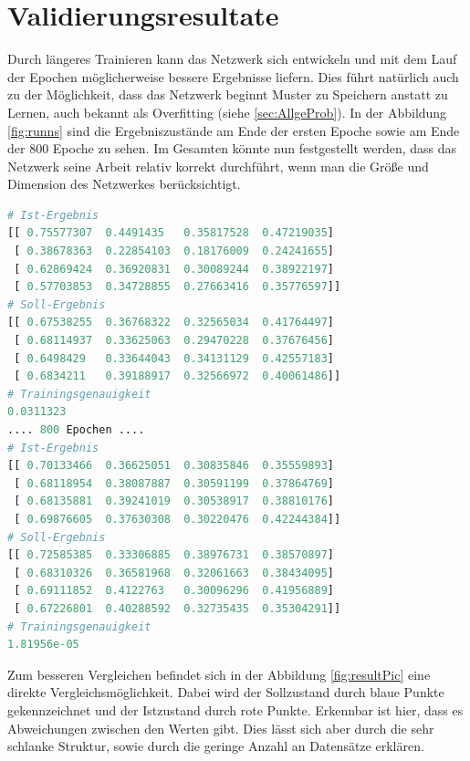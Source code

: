 \section{Validierungsresultate}

Durch längeres Trainieren kann das Netzwerk sich entwickeln und mit dem Lauf der Epochen möglicherweise bessere Ergebnisse liefern. 
Dies führt natürlich auch zu der Möglichkeit, dass das Netzwerk beginnt Muster zu Speichern anstatt zu Lernen, auch bekannt als Overfitting (siehe \ref{sec:AllgeProb}). 
In der Abbildung \ref{fig:runns} sind die Ergebniszustände am Ende der ersten Epoche sowie am Ende der $800$ Epoche zu sehen. 
Im Gesamten könnte nun festgestellt werden, dass das Netzwerk seine Arbeit relativ korrekt durchführt, wenn man die Größe und Dimension des Netzwerkes berücksichtigt. 
\begin{lstlisting}[caption={Ergebnisse am Ende der ersten Epoche und am Ende der $800$ Epoche},label=fig:runns,captionpos=b,language=Python]
# Ist-Ergebnis 
[[ 0.75577307  0.4491435   0.35817528  0.47219035]
 [ 0.38678363  0.22854103  0.18176009  0.24241655]
 [ 0.62869424  0.36920831  0.30089244  0.38922197]
 [ 0.57703853  0.34728855  0.27663416  0.35776597]]
# Soll-Ergebnis
[[ 0.67538255  0.36768322  0.32565034  0.41764497]
 [ 0.68114937  0.33625063  0.29470228  0.37676456]
 [ 0.6498429   0.33644043  0.34131129  0.42557183]
 [ 0.6834211   0.39188917  0.32566972  0.40061486]]
# Trainingsgenauigkeit
0.0311323
.... 800 Epochen ....
# Ist-Ergebnis
[[ 0.70133466  0.36625051  0.30835846  0.35559893]
 [ 0.68118954  0.38087887  0.30591199  0.37864769]
 [ 0.68135881  0.39241019  0.30538917  0.38810176]
 [ 0.69876605  0.37630308  0.30220476  0.42244384]]
# Soll-Ergebnis
[[ 0.72585385  0.33306885  0.38976731  0.38570897]
 [ 0.68310326  0.36581968  0.32061663  0.38434095]
 [ 0.69111852  0.4122763   0.30096296  0.41956889]
 [ 0.67226801  0.40288592  0.32735435  0.35304291]]
# Trainingsgenauigkeit
1.81956e-05
\end{lstlisting}
Zum besseren Vergleichen befindet sich in der Abbildung \ref{fig:resultPic} eine direkte Vergleichsmöglichkeit. 
Dabei wird der Sollzustand durch blaue Punkte gekennzeichnet und der Istzustand durch rote Punkte. 
Erkennbar ist hier, dass es Abweichungen zwischen den Werten gibt. 
Dies lässt sich aber durch die sehr schlanke Struktur, sowie durch die geringe Anzahl an Datensätze erklären. 
